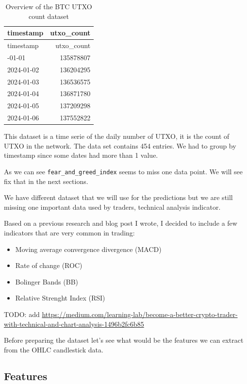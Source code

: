 \documentclass[
]{article}
\begin{document}
\begin{longtable}[]{@{}lr@{}}
\caption{Overview of the BTC UTXO count dataset}\tabularnewline
\toprule\noalign{}
timestamp & utxo\_count \\
\midrule\noalign{}
\endfirsthead
\toprule\noalign{}
timestamp & utxo\_count \\
\midrule\noalign{}
\endhead
\bottomrule\noalign{}
\endlastfoot
2024-01-01 & 135878807 \\
2024-01-02 & 136204295 \\
2024-01-03 & 136536575 \\
2024-01-04 & 136871780 \\
2024-01-05 & 137209298 \\
2024-01-06 & 137552822 \\
\end{longtable}

This dataset is a time serie of the daily number of UTXO, it is the
count of UTXO in the network. The data set contains 454 entries. We had
to group by timestamp since some dates had more than 1 value.

As we can see \texttt{fear\_and\_greed\_index} seems to miss one data
point. We will see fix that in the next sections.

We have different dataset that we will use for the predictions but we
are still missing one important data used by traders, technical analysis
indicator.

Based on a previous research and blog post I wrote, I decided to include
a few indicators that are very common in trading:

\begin{itemize}
\item
  Moving average convergence divergence (MACD)
\item
  Rate of change (ROC)
\item
  Bolinger Bands (BB)
\item
  Relative Strenght Index (RSI)
\end{itemize}

TODO: add
\url{https://medium.com/learning-lab/become-a-better-crypto-trader-with-technical-and-chart-analysis-1496b2fc6b85}

Before preparing the dataset let's see what would be the features we can
extract from the OHLC candlestick data.

\hypertarget{features}{%
\subsection{Features}\label{features}}
\end{document}
